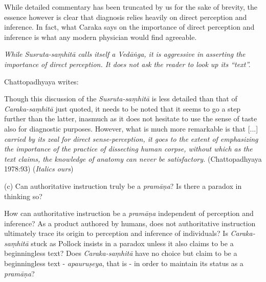 While detailed commentary has been truncated by us for the sake of brevity, the essence however is clear that diagnosis relies heavily on direct perception and inference.  In fact, what Caraka says on the importance of direct perception and inference is what any modern physician would find agreeable.

{{\sl While Susruta-saṃhitā calls itself a Vedāṅga, it is aggressive in asserting the importance of direct perception. It does not ask the reader to look up its ``text''.}}

\newpage

Chattopadhyaya writes:
\begin{myquote}
Though this discussion of the {\sl Susruta-saṃhitā} is less detailed than that of {\sl Caraka-saṃhitā} just quoted, it needs to be noted that it seems to go a step further than the latter, inasmuch as it does not hesitate to use the sense of taste also for diagnostic purposes.  However, what is much more remarkable is that [...] {\sl carried by its zeal for direct sense-perception, it goes to the extent of emphasizing the importance of the practice of dissecting human corpse, without which as the text claims, the knowledge of anatomy can never be satisfactory.}
\hfill (Chattopadhyaya 1978:93) ({\sl Italics ours})
\end{myquote}

(c) Can authoritative instruction truly be a {{\sl pramāṇa}\relax}?  Is there a paradox in thinking so?

How can authoritative instruction be a {\sl pramāṇa} independent of perception and inference? As a product authored by humans, does not authoritative instruction ultimately trace its origin to perception and inference of individuals? Is {\sl Caraka-saṃhitā} stuck as Pollock insists in a paradox unless it also claims to be a beginningless text?  Does {\sl Caraka-saṃhitā} have no choice but claim to be a beginningless text - {\sl apauruṣeya}, that is - in order to maintain its status as a {\sl pramāṇa}?

